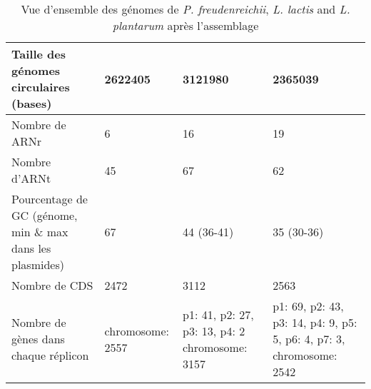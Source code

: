 \documentclass[../main.tex]{subfiles}
\begin{document}
\begin{table}[htpb]
\begin{tabular}{|p{3cm}|p{3cm}|p{2cm}|p{4cm}|}
    Taille des génomes circulaires (bases)  & \multicolumn{1}{l|}{2622405}                       & \multicolumn{1}{l|}{3121980}                    & \multicolumn{1}{l|}{2365039}         \\ \hline
    Nombre de ARNr  & \multicolumn{1}{l|}{6}                       & \multicolumn{1}{l|}{16}                    & \multicolumn{1}{l|}{19}         \\ \hline
    Nombre d'ARNt  & \multicolumn{1}{l|}{45}                       & \multicolumn{1}{l|}{67}                    & \multicolumn{1}{l|}{62}         \\ \hline
    Pourcentage de GC (génome, min \& max dans les plasmides) & \multicolumn{1}{l|}{67}                       & \multicolumn{1}{l|}{44 (36-41)}                    & \multicolumn{1}{l|}{35 (30-36)}         \\ \hline
    Nombre de CDS  & \multicolumn{1}{l|}{2472}                       & \multicolumn{1}{l|}{3112}                    & \multicolumn{1}{l|}{2563}         \\ \hline
    Nombre de gènes dans chaque réplicon  & \multicolumn{1}{l|}{chromosome: 2557}                       & \multicolumn{1}{p{3cm}|}{p1: 41, p2: 27, p3: 13, p4: 2 chromosome: 3157}                    & \multicolumn{1}{p{3cm}|}{p1: 69, p2: 43, p3: 14, p4: 9, p5: 5, p6: 4, p7: 3, chromosome: 2542}         \\ \hline
    \end{tabular}
    \caption{Vue d'ensemble des génomes de \textit{P. freudenreichii}, \textit{L. lactis} and \textit{L. plantarum} après l'assemblage}
    \label{tab:genomes}
    \end{table}


     
\end{document}
